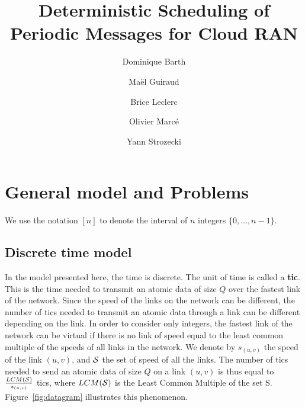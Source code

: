 \documentclass[10pt]{article}
\title{Deterministic Scheduling of Periodic Messages for Cloud RAN}
\author[1]{Dominique Barth}
\author[1,2]{Ma\"el Guiraud}
\author[2]{Brice Leclerc}
\author[2]{Olivier Marc\'e}
\author[1]{Yann Strozecki}
\affil[1]{David Laboratory, UVSQ}
\affil[2]{Nokia Bell Labs France}
\begin{document}
\maketitle

\section{General model and Problems}\label{sec:def}

We use the notation $[n]$ to denote the interval of $n$ integers $\{0,\dots,n-1\}$.

  \subsection{Discrete time model}
  In the model presented here, the time is discrete. The unit of time  is called a {\bf tic}. This is the time needed to transmit an atomic data of size $Q$ over the fastest link of the network. Since the speed of the links on the network can be different, the number of tics needed to transmit an atomic data through a link can be different depending on the link. In order to consider only integers, the fastest link of the network can be virtual if there is no link of speed equal to the least common multiple of the speeds of all links in the network. We denote by $s_{(u,v)}$ the speed of the link $(u,v)$, and ${\cal S}$ the set of speed of all the links. The number of tics needed to send an atomic data of size $Q$ on a link $(u,v)$ is thus equal to $\frac{LCM({\cal S})}{s_{(u,v)}}$ tics, where $LCM({\cal S})$ is the Least Common Multiple of the set {\cal S}. Figure~\ref{fig:datagram} illustrates this phenomenon.
  
\end{document}
